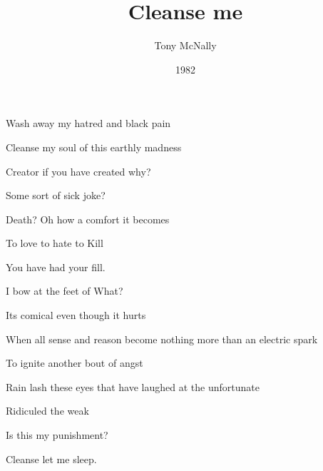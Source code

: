 \documentclass{article}
\title{Cleanse me}
\author{Tony McNally}
\date{1982}
\begin{document}
  \maketitle

  Wash away my hatred and black pain 

  Cleanse my soul of this earthly madness

  Creator if you have created why?

  Some sort of sick joke?

  Death? Oh how a comfort it becomes

  To love to hate to Kill 

  You have had your fill.

  I bow at the feet of What?

  Its comical even though it hurts 

  When all sense and reason become nothing more than an electric spark 

  To ignite another bout of angst

  Rain lash these eyes that have laughed at the unfortunate 

  Ridiculed the weak 

  Is this my punishment?

  Cleanse let me sleep.
\end{document}
